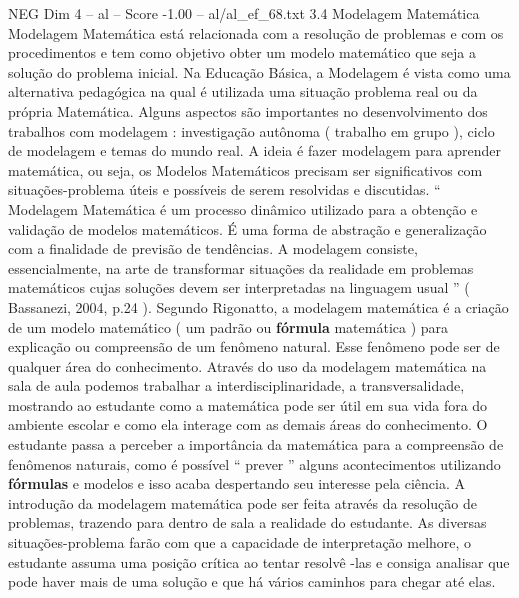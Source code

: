 \begin{textsample}{NEG Dim 4 – al – Score -1.00 – al/al\_ef\_68.txt}  \label{ex:f4_neg_248}
3.4 Modelagem Matemática Modelagem Matemática está relacionada com a resolução de problemas e com os procedimentos e tem como objetivo obter um modelo matemático que seja a solução do problema inicial.
Na Educação Básica, a Modelagem é vista como uma alternativa pedagógica na qual é utilizada uma situação problema real ou da própria Matemática.
Alguns aspectos são importantes no desenvolvimento dos trabalhos com modelagem : investigação autônoma ( trabalho em grupo ), ciclo de modelagem e temas do mundo real.
A ideia é fazer modelagem para aprender matemática, ou seja, os Modelos Matemáticos precisam ser significativos com situações-problema úteis e possíveis de serem resolvidas e discutidas. “ Modelagem Matemática é um processo dinâmico utilizado para a obtenção e validação de modelos matemáticos.
É uma forma de abstração e generalização com a finalidade de previsão de tendências.
A modelagem consiste, essencialmente, na arte de transformar situações da realidade em problemas matemáticos cujas soluções devem ser interpretadas na linguagem usual ” ( Bassanezi, 2004, p.24 ).
Segundo Rigonatto, a modelagem matemática é a criação de um modelo matemático ( um padrão ou \textbf{fórmula} matemática ) para explicação ou compreensão de um fenômeno natural.
Esse fenômeno pode ser de qualquer área do conhecimento.
Através do uso da modelagem matemática na sala de aula podemos trabalhar a interdisciplinaridade, a transversalidade, mostrando ao estudante como a matemática pode ser útil em sua vida fora do ambiente escolar e como ela interage com as demais áreas do conhecimento.
O estudante passa a perceber a importância da matemática para a compreensão de fenômenos naturais, como é possível “ prever ” alguns acontecimentos utilizando \textbf{fórmulas} e modelos e isso acaba despertando seu interesse pela ciência.
A introdução da modelagem matemática pode ser feita através da resolução de problemas, trazendo para dentro de sala a realidade do estudante.
As diversas situações-problema farão com que a capacidade de interpretação melhore, o estudante assuma uma posição crítica ao tentar resolvê -las e consiga analisar que pode haver mais de uma solução e que há vários caminhos para chegar até elas.

\end{textsample}
